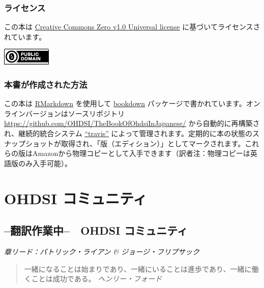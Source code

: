 \documentclass[
  11pt]{book}
\theoremstyle{definition}
\theoremstyle{definition}
\theoremstyle{definition}
\theoremstyle{definition}
\theoremstyle{remark}
\begin{document}
\section*{ライセンス}\label{ux30e9ux30a4ux30bbux30f3ux30b9}

この本は \href{http://creativecommons.org/publicdomain/zero/1.0/}{Creative Commons Zero v1.0 Universal license} に基づいてライセンスされています。

\includegraphics{images/Preface/cc0.png}

\section*{本書が作成された方法}\label{ux672cux66f8ux304cux4f5cux6210ux3055ux308cux305fux65b9ux6cd5}

この本は \href{https://rmarkdown.rstudio.com}{RMarkdown} を使用して \href{https://bookdown.org}{bookdown} パッケージで書かれています。オンラインバージョンはソースリポジトリ \url{https://github.com/OHDSI/TheBookOfOhdsiInJapanese/} から自動的に再構築され、継続的統合システム \href{http://travis-ci.org/}{``travis''} によって管理されます。定期的に本の状態のスナップショットが取得され、「版（エディション）」としてマークされます。これらの版はAmazonから物理コピーとして入手できます（訳者注：物理コピーは英語版のみ入手可能）。

\mainmatter

\part{OHDSI コミュニティ}\label{part-ohdsi-ux30b3ux30dfux30e5ux30cbux30c6ux30a3}

\chapter{--翻訳作業中--　OHDSI コミュニティ}\label{OhdsiCommunity}

\emph{章リード：パトリック・ライアン \& ジョージ・フリプサック}

\begin{quote}
一緒になることは始まりであり、一緒にいることは進歩であり、一緒に働くことは成功である。 \emph{ヘンリー・フォード}
\end{quote}
\end{document}
